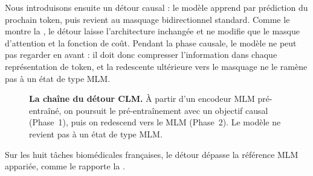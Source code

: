 Nous introduisons ensuite un détour causal : le modèle apprend par prédiction du
prochain token, puis revient au masquage bidirectionnel standard. Comme le montre la
, le détour laisse l'architecture inchangée et ne modifie que
le masque d'attention et la fonction de coût. Pendant la phase causale, le modèle ne
peut pas regarder en avant : il doit donc compresser l'information dans chaque
représentation de token, et la redescente ultérieure vers le masquage ne le ramène pas
à un état de type MLM.

\begin{figure}[ht]
\centering
{}
\caption{\textbf{La chaîne du détour CLM.} À partir d'un encodeur MLM pré-entraîné, on poursuit le pré-entraînement avec un objectif causal (Phase~1), puis on redescend vers le MLM (Phase~2). Le modèle ne revient pas à un état de type MLM.}
\label{fig:clm-pipeline}
\end{figure}

Sur les huit tâches biomédicales françaises, le détour dépasse la référence MLM
appariée, comme le rapporte la .

